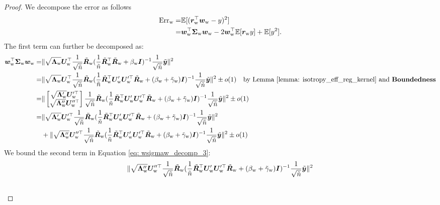 \begin{proof}
We decompose the error as follows
\begin{align}
    \nonumber
    \text{Err}_{\text{w}} =& \mathbb{E}[ ({\bm{r}}_{\text{w}}^\top {\bm{w}}_{\text{w}} - y)^2 ] \\
    \label{eq: errw_decomp_3}
    = & {\bm{w}}_{\text{w}}^\top {\bm{\Sigma}}_{\text{w}} {\bm{w}}_{\text{w}} - 2{\bm{w}}_{\text{w}}^\top \mathbb{E}[{\bm{r}}_{\text{w}} y] + \mathbb{E}[y^2].
\end{align}
The first term can further be decomposed as:
\begin{align}
    \nonumber
    {\bm{w}}_{\text{w}}^\top {\bm{\Sigma}}_{\text{w}} {\bm{w}}_{\text{w}} = &  \|\sqrt{{\bm{\Lambda}}_{\text{w}}}{\bm{U}}_{\text{w}}^\top \frac{1}{\sqrt{\tilde{n}}}\tilde{{\bm{R}}}_{\text{w}} (\frac{1}{\tilde{n}}\tilde{{\bm{R}}}_{\text{w}}^\top \tilde{{\bm{R}}}_{\text{w}} + \beta_{\text{w}}{\bm{I}} )^{-1}\frac{1}{\sqrt{\tilde{n}}}\tilde{{\bm{y}}} \|^2 \\
    \nonumber
    = & \|\sqrt{{\bm{\Lambda}}_{\text{w}}}{\bm{U}}_{\text{w}}^\top \frac{1}{\sqrt{\tilde{n}}}\tilde{{\bm{R}}}_{\text{w}} (\frac{1}{\tilde{n}}\tilde{{\bm{R}}}_{\text{w}}^\top {\bm{U}}_{\text{w}}'{\bm{U}}_{\text{w}}'^\top \tilde{{\bm{R}}}_{\text{w}} + (\beta_{\text{w}}+\tilde{\gamma}_{\text{w}}){\bm{I}} )^{-1}\frac{1}{\sqrt{\tilde{n}}}\tilde{{\bm{y}}} \|^2 \pm o(1) \quad\text{by Lemma \ref{lemma: isotropy_eff_reg_kernel} and \textbf{Boundedness}{}} \\
    \nonumber
    = &  \| \begin{bmatrix} \sqrt{{\bm{\Lambda}}_{\text{w}}'}{\bm{U}}_{\text{w}}'^\top \\ \sqrt{{\bm{\Lambda}}_{\text{w}}''}{\bm{U}}_{\text{w}}''^\top   \end{bmatrix} \frac{1}{\sqrt{\tilde{n}}}\tilde{{\bm{R}}}_{\text{w}} (\frac{1}{\tilde{n}}\tilde{{\bm{R}}}_{\text{w}}^\top {\bm{U}}_{\text{w}}'{\bm{U}}_{\text{w}}'^\top \tilde{{\bm{R}}}_{\text{w}} + (\beta_{\text{w}}+\tilde{\gamma}_{\text{w}}){\bm{I}} )^{-1}\frac{1}{\sqrt{\tilde{n}}}\tilde{{\bm{y}}} \|^2 \pm o(1) \\
    \nonumber
    = & \| \sqrt{{\bm{\Lambda}}_{\text{w}}'}{\bm{U}}_{\text{w}}'^\top \frac{1}{\sqrt{\tilde{n}}}\tilde{{\bm{R}}}_{\text{w}} (\frac{1}{\tilde{n}}\tilde{{\bm{R}}}_{\text{w}}^\top {\bm{U}}_{\text{w}}'{\bm{U}}_{\text{w}}'^\top \tilde{{\bm{R}}}_{\text{w}} + (\beta_{\text{w}}+\tilde{\gamma}_{\text{w}}){\bm{I}} )^{-1}\frac{1}{\sqrt{\tilde{n}}}\tilde{{\bm{y}}} \|^2 \\
    \label{eq: wsigmaw_decomp_3}
    & + \| \sqrt{{\bm{\Lambda}}_{\text{w}}''}{\bm{U}}_{\text{w}}''^\top   \frac{1}{\sqrt{\tilde{n}}}\tilde{{\bm{R}}}_{\text{w}} (\frac{1}{\tilde{n}}\tilde{{\bm{R}}}_{\text{w}}^\top {\bm{U}}_{\text{w}}'{\bm{U}}_{\text{w}}'^\top \tilde{{\bm{R}}}_{\text{w}} + (\beta_{\text{w}}+\tilde{\gamma}_{\text{w}}){\bm{I}} )^{-1}\frac{1}{\sqrt{\tilde{n}}}\tilde{{\bm{y}}} \|^2   \pm o(1) 
\end{align}
We bound the second term in Equation \ref{eq: wsigmaw_decomp_3}:
\begin{align}
    \nonumber
    &\| \sqrt{\mLambda_\w''}\mU_\w''^\top   \frac{1}{\sqrt{\tilde{n}}}\tilde{\mR}_\w (\frac{1}{\tilde{n}}\tilde{\mR}_\w^\top \mU_\w'\mU_\w'^\top \tilde{\mR}_\w + (\beta_\w+\tilde{\gamma}_\w)\mI )^{-1}\frac{1}{\sqrt{\tilde{n}}}\tilde{\vy} \|^2 \\
    \nonumber

\end{align}
\end{proof}
